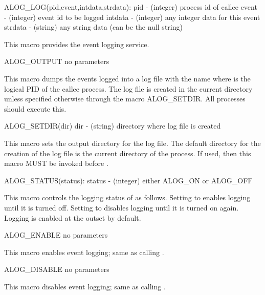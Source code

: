 \begin{example}
ALOG_LOG(pid,event,intdata,strdata):
  pid     - (integer) process id of callee
  event   - (integer) event id to be logged
  intdata - (integer) any integer data for this event
  strdata - (string) any string data (can be the null string)
\end{example}
\noindent
This macro provides the event logging service.

\begin{example}
ALOG_OUTPUT
  no parameters  
\end{example}
\noindent
This macro dumps the events logged into a log file with the name
 where  is the logical PID of the callee process.
The log file is created in the current directory unless specified otherwise
through the macro ALOG_SETDIR.  All processes should execute this.

\begin{example}
ALOG_SETDIR(dir)
  dir - (string) directory where log file is created
\end{example}
\noindent
This macro sets the output directory for the log file.  The default directory
for the creation of the log file is the current directory of the process.  If
used, then this macro MUST be invoked before .

\begin{example}
ALOG_STATUS(status):
  status - (integer) either ALOG_ON or ALOG_OFF
\end{example}
\noindent

This macro controls the logging status of  as follows.  Setting
 to  enables logging until it is turned off.
Setting  to  disables logging until it is turned
on again.  Logging is enabled at the outset by default.


\begin{example}
ALOG_ENABLE
  no parameters
\end{example}
\noindent

This macro enables event logging; same as calling .

\begin{example}
ALOG_DISABLE
  no parameters
\end{example}
\noindent
This macro disables event logging; same as calling
.

